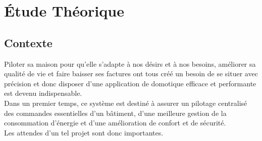 \setcounter{mtc}{3} %
\chapter{Étude Théorique}
\minitoc  %

\graphicspath{{Chapitre1/figures/}}
\pagestyle{fancy}
\fancyhf{}
\fancyfoot[R]{\thepage}
\renewcommand{\headrulewidth}{0.5pt}
\renewcommand{\footrulewidth}{0pt}

\begin{spacing}{1.2}

\section{Contexte}
Piloter sa maison pour qu’elle s’adapte à nos désirs et à nos besoins, améliorer sa qualité de vie et faire baisser ses factures ont tous créé un besoin de se situer avec précision et donc disposer d’une application de domotique efficace et performante est devenu indispensable. \\
Dans un premier temps, ce système est destiné à assurer un pilotage centralisé des commandes essentielles d’un bâtiment, d’une meilleure gestion de la consommation d’énergie et d’une amélioration de confort et de sécurité.\\
Les attendes d’un tel projet sont donc importantes.

\end{spacing}

